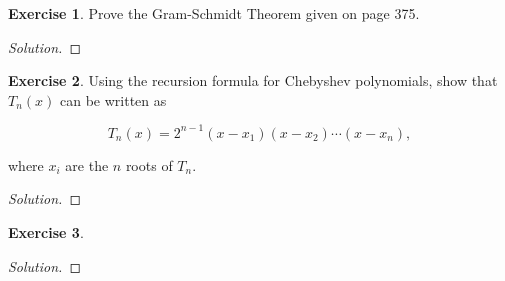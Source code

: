 \documentclass[12pt,a4]{article}
\theoremstyle{definition}
\newtheorem{exercise}{Exercise}
\begin{document}
\begin{exercise}
	Prove the Gram-Schmidt Theorem given on page 375. 
\end{exercise}
\begin{proof}[Solution]
	
\end{proof}

\begin{exercise}
	Using the recursion formula for Chebyshev polynomials, show that $T_n(x)$ can be written as
	
	\[
	T_n(x) = 2^{n - 1} (x - x_1) (x - x_2) \cdots (x - x_n) {,}
	\]
	
	\noindent where $x_i$ are the $n$ roots of $T_n$. 
\end{exercise}
\begin{proof}[Solution]
	
\end{proof}

\begin{exercise}
	
\end{exercise}
\begin{proof}[Solution]
	
\end{proof}
\end{document}
